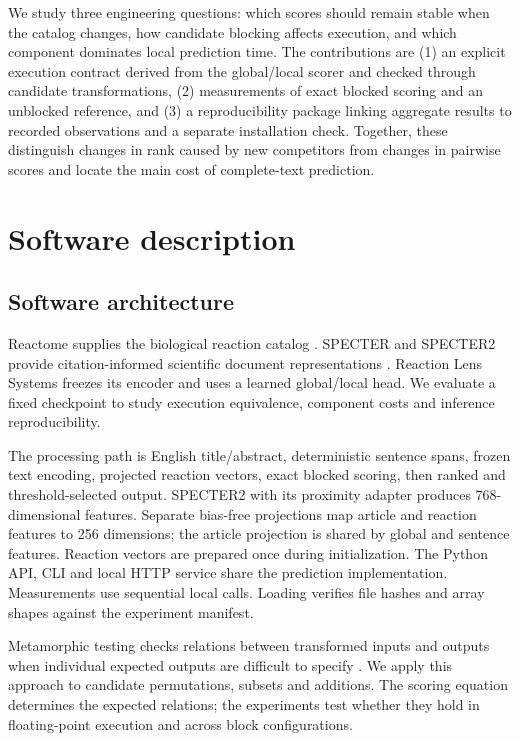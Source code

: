 \documentclass[preprint,12pt,a4paper]{elsarticle}
\begin{document}
We study three engineering questions: which scores should remain stable when the
catalog changes, how candidate blocking affects execution, and which component
dominates local prediction time. The contributions are (1) an explicit execution
contract derived from the global/local scorer and checked through candidate
transformations, (2) measurements of exact blocked scoring and an unblocked
reference, and (3) a reproducibility package linking aggregate results to recorded
observations and a separate installation check. Together, these distinguish
changes in rank caused by new competitors from changes in pairwise scores and
locate the main cost of complete-text prediction.
\section{Software description}
\subsection{Software architecture}
Reactome supplies the biological reaction catalog \citep{reactome2026}.
SPECTER and SPECTER2 provide citation-informed scientific document representations
\citep{cohan2020specter,singh2023scirepeval}. Reaction Lens Systems freezes its encoder and
uses a learned global/local head. We evaluate a fixed checkpoint to study
execution equivalence, component costs and inference reproducibility.

The processing path is English title/abstract, deterministic sentence spans,
frozen text encoding, projected reaction vectors, exact blocked scoring, then
ranked and threshold-selected output. SPECTER2 with its proximity adapter produces
768-dimensional features. Separate bias-free projections map article and reaction
features to 256 dimensions; the article projection is shared by global and
sentence features. Reaction vectors are prepared once during initialization.
The Python API, CLI and local HTTP service share the prediction implementation.
Measurements use sequential local calls. Loading verifies file hashes and array
shapes against the experiment manifest.

Metamorphic testing checks relations between transformed inputs and outputs when
individual expected outputs are difficult to specify \citep{segura2016}.
We apply this approach to candidate permutations, subsets and additions. The
scoring equation determines the expected relations; the experiments test whether
they hold in floating-point execution and across block configurations.
\end{document}
